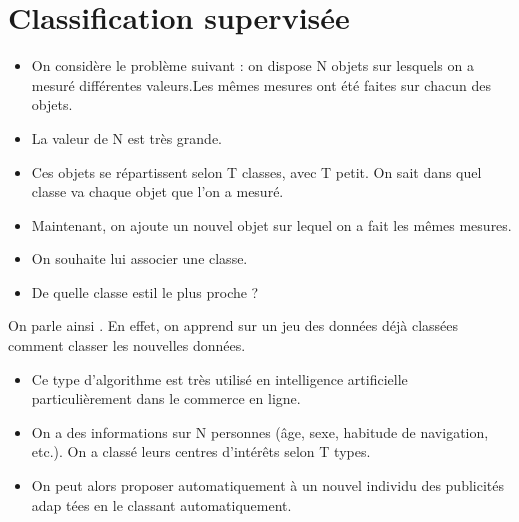 \documentclass[letterpaper,10pt,english]{jupyterBook}
\begin{document}
\section{Classification supervisée}
\label{\detokenize{notebooks/Machine-Learning/KNN-Cours:classification-supervisee}}\begin{itemize}
\item {} 
\sphinxAtStartPar
On considère le problème suivant : on dispose N objets sur lesquels on a mesuré différentes valeurs.Les mêmes mesures ont été faites sur chacun des objets.

\item {} 
\sphinxAtStartPar
La valeur de N est très grande.

\item {} 
\sphinxAtStartPar
Ces objets se répartissent selon T classes, avec T petit. On sait dans quel classe va chaque objet que l’on a mesuré.

\item {} 
\sphinxAtStartPar
Maintenant, on ajoute un nouvel objet sur lequel on a fait les mêmes mesures.

\item {} 
\sphinxAtStartPar
On souhaite lui associer une classe.

\item {} 
\sphinxAtStartPar
De quelle classe est\sphinxhyphen{}il le plus proche ?

\end{itemize}

\sphinxAtStartPar
On parle ainsi  . En effet, on apprend sur un jeu des données déjà classées comment classer les nouvelles données.

\sphinxAtStartPar
{}
\begin{itemize}
\item {} 
\sphinxAtStartPar
Ce type d’algorithme est très utilisé en intelligence artificielle particulièrement dans le commerce en ligne.

\item {} 
\sphinxAtStartPar
On a des informations sur N personnes (âge, sexe, habitude de navigation, etc.). On a classé leurs centres d’intérêts selon T types.

\item {} 
\sphinxAtStartPar
On peut alors proposer automatiquement à un nouvel individu des publicités adap\sphinxhyphen{}
tées en le classant automatiquement.

\end{itemize}
\end{document}

